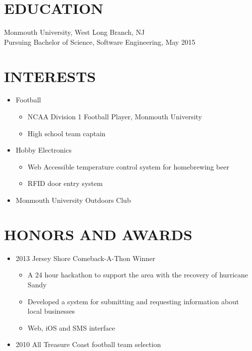 \documentclass{res}
\begin{document}
\begin{resume}
\section{EDUCATION}          
    Monmouth University, West Long Branch, NJ  \\        
    Pursuing Bachelor of Science, Software Engineering, May 2015   \\       


\section{INTERESTS}          
    \begin{itemize}
        \item Football
            \begin{itemize}
                \item NCAA Division 1 Football Player, Monmouth University
                \item High school team captain
            \end{itemize}
        \item Hobby Electronics
            \begin{itemize}
                \item Web Accessible temperature control system for homebrewing beer
                \item RFID door entry system
            \end{itemize}
        \item Monmouth University Outdoors Club
    \end{itemize}
 

\section{HONORS AND AWARDS}          
    \begin{itemize}
        \item 2013 Jersey Shore Comeback-A-Thon Winner
            \begin{itemize}
                \item A 24 hour hackathon to support the area with the recovery of hurricane Sandy
                \item Developed a system for submitting and requesting information about local businesses
                \item Web, iOS and SMS interface
            \end{itemize}
        \item 2010 All Treasure Coast football team selection
    \end{itemize}
 
 
\end{resume}
\end{document}
